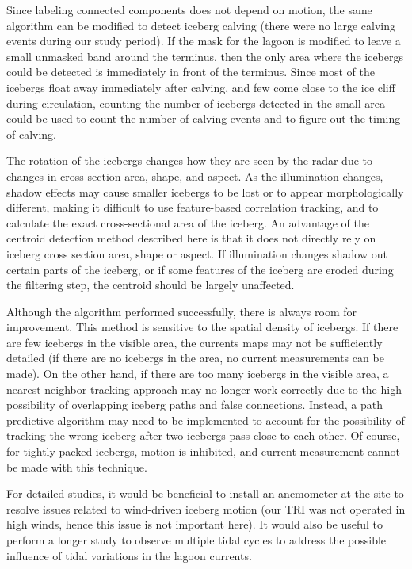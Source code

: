 Since labeling connected components does not depend on motion, the same algorithm can be modified to detect iceberg calving (there were no large calving events during our study period). If the mask for the lagoon is modified to leave a small unmasked band around the terminus, then the only area where the icebergs could be detected is immediately in front of the terminus. Since most of the icebergs float away immediately after calving, and few come close to the ice cliff during circulation, counting the number of icebergs detected in the small area could be used to count the number of calving events and to figure out the timing of calving.

The rotation of the icebergs changes how they are seen by the radar due to changes in cross-section area, shape, and aspect. As the illumination changes, shadow effects may cause smaller icebergs to be lost or to appear morphologically different, making it difficult to use feature-based correlation tracking, and to calculate the exact cross-sectional area of the iceberg. An advantage of the centroid detection method described here is that it does not directly rely on iceberg cross section area, shape or aspect. If illumination changes shadow out certain parts of the iceberg, or if some features of the iceberg are eroded during the filtering step, the centroid should be largely unaffected.



Although the algorithm performed successfully, there is always room for improvement. This method is sensitive to the spatial density of icebergs. If there are few icebergs in the visible area, the currents maps may not be sufficiently detailed (if there are no icebergs in the area, no current measurements can be made). On the other hand, if there are too many icebergs in the visible area, a nearest-neighbor tracking approach may no longer work correctly due to the high possibility of overlapping iceberg paths and false connections. Instead, a path predictive algorithm may need to be implemented to account for the possibility of tracking the wrong iceberg after two icebergs pass close to each other.  Of course, for tightly packed icebergs, motion is inhibited, and current measurement cannot be made with this technique. 

For detailed studies, it would be beneficial to install an anemometer at the site to resolve issues related to wind-driven iceberg motion (our TRI was not operated in high winds, hence this issue is not important here).  It would also be useful to perform a longer study to observe multiple tidal cycles to address the possible influence of tidal variations in the lagoon currents. 

